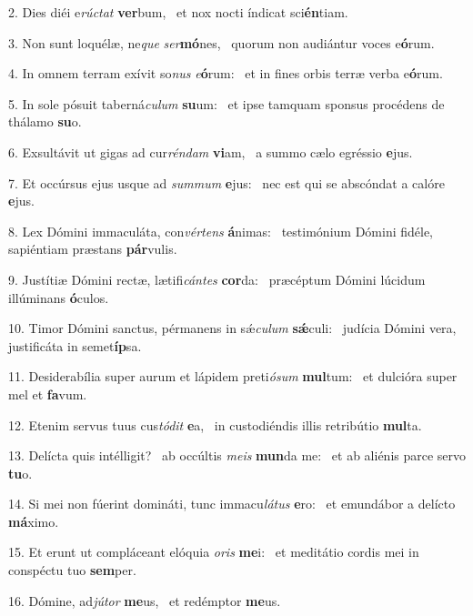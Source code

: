 2. Dies diéi e\textit{rúc}\textit{tat} \textbf{ver}bum, \ast\  et nox nocti índicat sci\textbf{én}tiam.\

3. Non sunt loquélæ, ne\textit{que} \textit{ser}\textbf{mó}nes, \ast\  quorum non audiántur voces e\textbf{ó}rum.\

4. In omnem terram exívit so\textit{nus} \textit{e}\textbf{ó}rum: \ast\  et in fines orbis terræ verba e\textbf{ó}rum.\

5. In sole pósuit taberná\textit{cu}\textit{lum} \textbf{su}um: \ast\  et ipse tamquam sponsus procédens de thálamo \textbf{su}o.\

6. Exsultávit ut gigas ad cur\textit{rén}\textit{dam} \textbf{vi}am, \ast\  a summo cælo egréssio \textbf{e}jus.\

7. Et occúrsus ejus usque ad \textit{sum}\textit{mum} \textbf{e}jus: \ast\  nec est qui se abscóndat a calóre \textbf{e}jus.\

8. Lex Dómini immaculáta, con\textit{vér}\textit{tens} \textbf{á}nimas: \ast\  testimónium Dómini fidéle, sapiéntiam præstans \textbf{pár}vulis.\

9. Justítiæ Dómini rectæ, lætifi\textit{cán}\textit{tes} \textbf{cor}da: \ast\  præcéptum Dómini lúcidum illúminans \textbf{ó}culos.\

10. Timor Dómini sanctus, pérmanens in sǽ\textit{cu}\textit{lum} \textbf{sǽ}culi: \ast\  judícia Dómini vera, justificáta in semet\textbf{íp}sa.\

11. Desiderabília super aurum et lápidem preti\textit{ó}\textit{sum} \textbf{mul}tum: \ast\  et dulcióra super mel et \textbf{fa}vum.\

12. Etenim servus tuus cus\textit{tó}\textit{dit} \textbf{e}a, \ast\  in custodiéndis illis retribútio \textbf{mul}ta.\

13. Delícta quis intélligit? \dag\  ab occúltis \textit{me}\textit{is} \textbf{mun}da me: \ast\  et ab aliénis parce servo \textbf{tu}o.\

14. Si mei non fúerint domináti, tunc immacu\textit{lá}\textit{tus} \textbf{e}ro: \ast\  et emundábor a delícto \textbf{má}ximo.\

15. Et erunt ut compláceant elóquia \textit{o}\textit{ris} \textbf{me}i: \ast\  et meditátio cordis mei in conspéctu tuo \textbf{sem}per.\

16. Dómine, ad\textit{jú}\textit{tor} \textbf{me}us, \ast\  et redémptor \textbf{me}us.\

